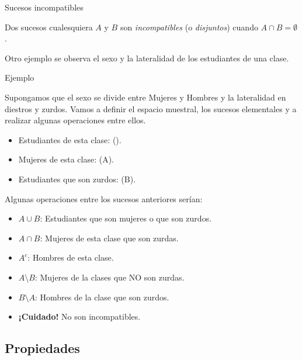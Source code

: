 \documentclass[
  letterpaper,
  DIV=11,
  numbers=noendperiod]{scrreprt}
\providecommand{\tightlist}{%
  \setlength{\itemsep}{0pt}\setlength{\parskip}{0pt}}\usepackage{longtable,booktabs,array}
\begin{document}
\begin{Definicion}{Sucesos incompatibles}{}

Dos sucesos cualesquiera \(A\) y \(B\) son \emph{incompatibles} (o
\emph{disjuntos}) cuando \(A\cap B=\emptyset\).

\end{Definicion}

Otro ejemplo se observa el sexo y la lateralidad de los estudiantes de
una clase.

\begin{Ejemplo}{Ejemplo}{}

Supongamos que el sexo se divide entre Mujeres y Hombres y la
lateralidad en diestros y zurdos. Vamos a definir el espacio muestral,
los sucesos elementales y a realizar algunas operaciones entre ellos.

\begin{itemize}
\tightlist
\item
  Estudiantes de esta clase: (\Omega).
\item
  Mujeres de esta clase: (A).
\item
  Estudiantes que son zurdos: (B).
\end{itemize}

\end{Ejemplo}

Algunas operaciones entre los sucesos anteriores serían:

\begin{itemize}
\tightlist
\item
  \(A\cup B\): Estudiantes que son mujeres o que son zurdos.
\item
  \(A\cap B\): Mujeres de esta clase que son zurdas.
\item
  \(A^c\): Hombres de esta clase.
\item
  \(A\setminus B\): Mujeres de la clases que NO son zurdas.
\item
  \(B\setminus A\): Hombres de la clase que son zurdos.
\item
  \textbf{¡Cuidado!} No son incompatibles.
\end{itemize}

\subsection{Propiedades}\label{propiedades}
\end{document}
